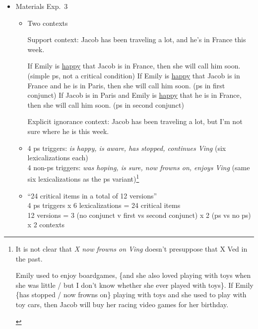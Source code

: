 \documentclass[11pt,fleqn]{article}
\newcommand{\6}{\mbox{$[\hspace*{-.6mm}[$}}
\newcommand{\9}{\mbox{$]\hspace*{-.6mm}]$}}
\begin{document}
\begin{itemize}
\begin{itemize}
\end{itemize}

\item Materials Exp.~3

\begin{itemize}

\item Two contexts

\begin{exe}
\ex 
\begin{xlist}
\ex Support context: Jacob has been traveling a lot, and he's in France this week.
\begin{xlist}
\ex If Emily is \underline{happy} that Jacob is in France, then she will call him soon. \hfill (simple ps, not a critical condition)
\ex If Emily is \underline{happy} that Jacob is in France and he is in Paris, then she will call him soon. \hfill (ps in first conjunct)
\ex If Jacob is in Paris and Emily is \underline{happy} that he is in France, then she will call him soon. \hfill (ps in second conjunct)
\end{xlist}

\ex Explicit ignorance context: Jacob has been traveling a lot, but I'm not sure where he is this week.

\end{xlist}
\end{exe}

\item 4 ps triggers: {\em is happy, is aware, has stopped, continues V{\em ing}} (six lexicalizations each)
\\ 4 non-ps triggers: {\em was hoping, is sure, now frowns on, enjoys V{\em ing}} (same six lexicalizations as the ps variant)\footnote{It is not clear that {\em X now frowns on Ving} doesn't presuppose that X Ved in the past. 
\begin{exe}
 Emily used to enjoy boardgames, \{and she also loved playing with toys when she was little / but I don't know whether she ever played with toys\}. If Emily \{has stopped / now frowns on\} playing with toys and she used to play with toy cars, then Jacob will buy her racing video games for her birthday.
\end{exe}
}

\item ``24 critical items in a total of 12 versions''
\\ 4 ps triggers x 6 lexicalizations = 24 critical items
\\ 12 versions = 3 (no conjunct v first vs second conjunct) x 2 (ps vs no ps) x 2 contexts 


\end{itemize}
\end{itemize}
\end{document}
